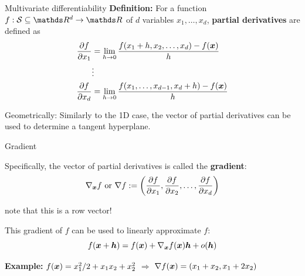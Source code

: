 \documentclass[11pt,compress,t,notes=noshow, xcolor=table]{beamer}
\newcommand{\hv}{\bm{h}}
\begin{document}
\begin{framev}{Multivariate differentiability}
\textbf{Definition:} For a function $f: \S\subseteq \R^d \to \R$ of $d$ variables $x_1, \ldots, x_d$, \textbf{partial derivatives} are defined as
$$
\begin{aligned}
\frac{\partial f}{\partial x_1} & =\lim _{h \rightarrow 0} \frac{f(x_1+h, x_2, \ldots, x_d)-f(\bm{x})}{h} \\
& \vdots \\
\frac{\partial f}{\partial x_d} & =\lim _{h \rightarrow 0} \frac{f(x_1, \ldots, x_{d-1}, x_d+h)-f(\bm{x})}{h}
\end{aligned}
$$
\vfill
{}
\begin{center}
\begin{footnotesize}
Geometrically: Similarly to the 1D case, the vector of partial derivatives can be used to determine a tangent hyperplane.
\end{footnotesize}
\end{center}
\end{framev}


\begin{framei}{Gradient}
\item Specifically, the vector of partial derivatives is called the \textbf{gradient}:
$$
\nabla_{\bm{x}} f \text{ or } \nabla f :=
\left(\frac{\partial f}{\partial x_1}, \frac{\partial f}{\partial x_2}, \ldots, \frac{\partial f}{\partial x_d}\right)
$$
\begin{footnotesize}
note that this is a row vector!
\end{footnotesize}
\item This gradient of $f$ can be used to linearly approximate $f$:
$$
f(\xv+\hv)=f(\xv)+\nabla_{\xv}\fx \hv+o(\hv)
$$
\item \textbf{Example:} $f(\bm{x}) = x_1^2/2 + x_1 x_2 + x_2^2$ $\Rightarrow$ $\nabla f(\bm{x}) = (x_1 + x_2, x_1 + 2x_2)$
\vfill
{}
\end{framei}
\end{document}
